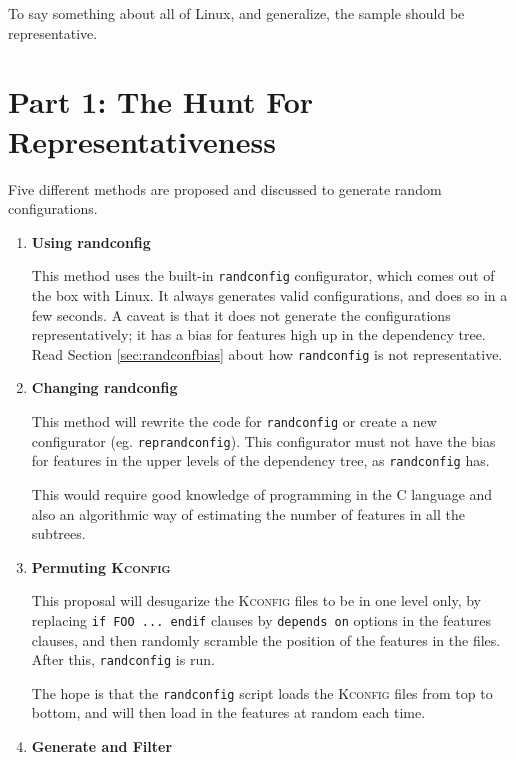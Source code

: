 \documentclass[a4paper,11pt]{report}
\newcommand{\textcode}[1]{\fboxsep=1pt\texttt{\colorbox{gray!20}{#1}}}
\begin{document}
To say something about all of Linux, and generalize, the sample should be representative.


        \section{Part 1: The Hunt For Representativeness}
        \label{rephunt}


Five different methods are proposed and discussed to generate random 
configurations.

\begin{enumerate}

    \item \textbf{Using randconfig}

This method uses the built-in \texttt{randconfig} configurator, which comes out 
of the box with Linux. It always generates valid configurations,
and does so in a few seconds. A caveat is that it does not generate the 
configurations representatively; it has a bias for features high up in the 
dependency tree.  Read Section \ref{sec:randconfbias} about how 
\texttt{randconfig} is not representative.


    \item \textbf{Changing randconfig}

This method will rewrite the code for \texttt{randconfig} or create a new 
configurator (eg. \texttt{reprandconfig}).  This configurator must not have the 
bias for features in the upper levels of the dependency tree, as 
\texttt{randconfig} has.

This would require good knowledge of programming in the \textsc{C} language
and also an algorithmic way of estimating the number of features in all the 
subtrees.


    \item \textbf{Permuting \textsc{Kconfig}}


This proposal will desugarize the \textsc{Kconfig} files to be in one level 
only, by replacing \textcode{if FOO ... endif} clauses by \textcode{depends on} 
options in the features clauses, and then randomly scramble the position of 
the features in the files. After this, \texttt{randconfig} is run.

The hope is that the \texttt{randconfig} script loads the \textsc{Kconfig} 
files from top to bottom, and will then load in the features at random each 
time.


    \item \textbf{Generate and Filter}


\end{enumerate}
\end{document}
